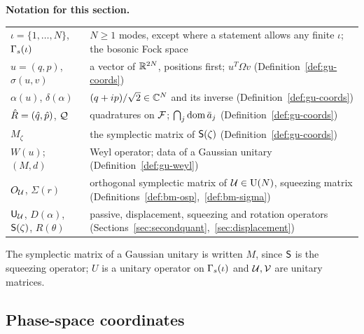 \begin{veteenv}
\medskip
\noindent\textbf{Notation for this section.}
\begin{center}
\begin{tabular}{@{}L{0.3\textwidth}L{0.64\textwidth}@{}}
$\iota=\{1,\ldots,N\}$, $\Gamma_s(\iota)$ & $N\ge1$ modes, except where a statement allows any finite $\iota$; the bosonic Fock space\\
$u=(q,p)$, $\sigma(u,v)$ & a vector of $\mathbb R^{2N}$, positions first; $u^T\Omega v$ (Definition~\ref{def:gu-coords})\\
$\alpha(u)$, $\delta(\alpha)$ & $(q+ip)/\sqrt2\in\mathbb C^N$ and its inverse (Definition~\ref{def:gu-coords})\\
$\hat R=(\hat q,\hat p)$, $\mathcal Q$ & quadratures on $\mathcal F$; $\bigcap_j\operatorname{dom}\bar a_j$ (Definition~\ref{def:gu-coords})\\
$M_\zeta$ & the symplectic matrix of $\mathsf S(\zeta)$ (Definition~\ref{def:gu-coords})\\
$W(u)$; $(M,d)$ & Weyl operator; data of a Gaussian unitary (Definition~\ref{def:gu-weyl})\\
$O_\mathcal U$, $\Sigma(r)$ & orthogonal symplectic matrix of $\mathcal U\in\mathrm{U}(N)$, squeezing matrix (Definitions~\ref{def:bm-osp},~\ref{def:bm-sigma})\\
$\mathsf U_\mathcal U$, $D(\alpha)$, $\mathsf S(\zeta)$, $R(\theta)$ & passive, displacement, squeezing and rotation operators
(Sections~\ref{sec:secondquant},~\ref{sec:displacement})\\
\end{tabular}
\end{center}
The symplectic matrix of a Gaussian unitary is written $M$, since $\mathsf S$ is the squeezing operator; $U$ is a unitary operator on
$\Gamma_s(\iota)$ and $\mathcal U,\mathcal V$ are unitary matrices.

\subsection{Phase-space coordinates}\label{sec:gu-coords}


\end{veteenv}

